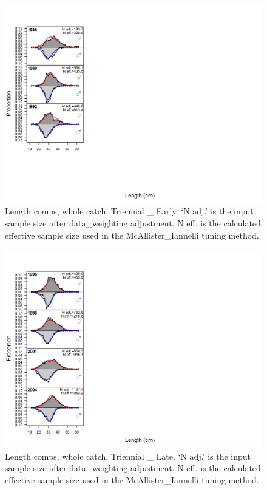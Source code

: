 \documentclass[12pt,]{article}
\begin{document}
\begin{figure}
\centering
\includegraphics{r4ss/plots_mod1/comp_lenfit_flt5mkt0.png}
\caption{Length comps, whole catch, Triennial \_ Early. `N adj.' is the
input sample size after data\_weighting adjustment. N eff. is the
calculated effective sample size used in the McAllister\_Iannelli tuning
method. \label{fig:length_fits}}
\end{figure}

\begin{figure}
\centering
\includegraphics{r4ss/plots_mod1/comp_lenfit_flt6mkt0.png}
\caption{Length comps, whole catch, Triennial \_ Late. `N adj.' is the
input sample size after data\_weighting adjustment. N eff. is the
calculated effective sample size used in the McAllister\_Iannelli tuning
method. \label{fig:length_fits}}
\end{figure}
\end{document}

